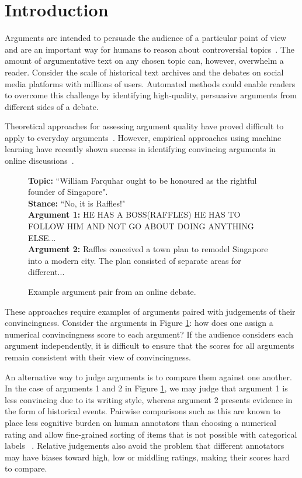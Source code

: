 \section{Introduction}\label{sec:intro}

Arguments are intended to persuade the audience of a particular point of view and 
are an important way for humans to reason about controversial topics~\cite{mercier2011humans}. 
The amount of argumentative text on any chosen topic can, however, overwhelm a reader.
Consider the scale of historical text archives 
and the debates on social media platforms with millions of users.
Automated methods could enable readers to overcome this challenge by identifying high-quality, 
persuasive arguments from different sides of a debate. 

Theoretical approaches for assessing argument quality have proved difficult to apply to everyday arguments~\cite{boudry2015fake}.
However, empirical approaches using machine learning have recently shown success in 
identifying convincing arguments in online discussions~\cite{habernal2016argument}.
\begin{figure}
\textbf{Topic:} ``William Farquhar ought to be honoured as the rightful founder of Singapore". \\
\textbf{Stance:} ``No, it is Raffles!" \\
\textbf{Argument 1:}  
HE HAS A BOSS(RAFFLES) HE HAS TO FOLLOW HIM AND NOT GO ABOUT DOING ANYTHING ELSE... \\
\textbf{Argument 2:} 
Raffles conceived a town plan to remodel Singapore into a modern city. The plan consisted of separate areas for different...
\caption{Example argument pair from an online debate.}
\label{fig:argument_examples}
\end{figure}
These approaches require examples of arguments paired with judgements of their convincingness.
Consider the arguments in Figure \ref{fig:argument_examples}:
how does one assign a numerical convincingness score to each argument? 
If the audience considers each argument independently, it is difficult to ensure that the scores for all arguments
remain consistent with their view of convincingness.

An alternative way to judge arguments is to compare them against one another. 
In the case of arguments 1 and 2 in Figure \ref{fig:argument_examples}, we may judge that argument 1 is less convincing due to its writing style, whereas argument 2 
presents evidence in the form of historical events.
Pairwise comparisons such as this are known to place less cognitive burden on human annotators than  
choosing a numerical rating and allow fine-grained sorting of items that is not possible with categorical labels
~\cite{kendall1948rank,kingsley2006preference}.
Relative judgements also avoid the problem that different annotators 
may have biases toward high, low or middling ratings, making their scores hard to compare.

